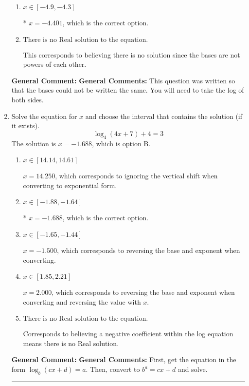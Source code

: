 \documentclass{extbook}[14pt]
\newcommand{\litem}[1]{\item #1

\rule{\textwidth}{0.4pt}}
\begin{document}
\begin{enumerate}
{\begin{enumerate}[label=\Alph*.]
$x = 6.879$, which corresponds to distributing the $\ln(base)$ to the second term of the exponent only.
\item \( x \in [-4.9, -4.3] \)

* $x = -4.401$, which is the correct option.
\item \( \text{There is no Real solution to the equation.} \)

This corresponds to believing there is no solution since the bases are not powers of each other.
\end{enumerate}

\textbf{General Comment:} \textbf{General Comments:} This question was written so that the bases could not be written the same. You will need to take the log of both sides.
}
\litem{
Solve the equation for $x$ and choose the interval that contains the solution (if it exists).
\[ \log_{4}{(4x+7)}+4 = 3 \]
The solution is \( x = -1.688 \), which is option B.\begin{enumerate}[label=\Alph*.]
\item \( x \in [14.14, 14.61] \)

$x = 14.250$, which corresponds to ignoring the vertical shift when converting to exponential form.
\item \( x \in [-1.88, -1.64] \)

* $x = -1.688$, which is the correct option.
\item \( x \in [-1.65, -1.44] \)

$x = -1.500$, which corresponds to reversing the base and exponent when converting.
\item \( x \in [1.85, 2.21] \)

$x = 2.000$, which corresponds to reversing the base and exponent when converting and reversing the value with $x$.
\item \( \text{There is no Real solution to the equation.} \)

Corresponds to believing a negative coefficient within the log equation means there is no Real solution.
\end{enumerate}

\textbf{General Comment:} \textbf{General Comments:} First, get the equation in the form $\log_b{(cx+d)} = a$. Then, convert to $b^a = cx+d$ and solve.
}
\end{enumerate}
\end{document}
